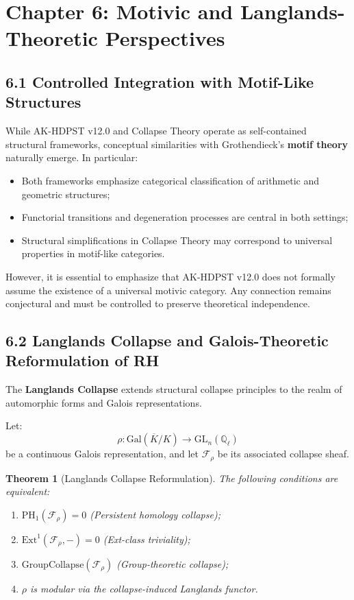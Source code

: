 \documentclass[11pt]{article}
\newtheorem{theorem}{Theorem}[section]
\begin{document}
\section{Chapter 6: Motivic and Langlands-Theoretic Perspectives}

\subsection*{6.1 Controlled Integration with Motif-Like Structures}

While AK-HDPST v12.0 and Collapse Theory operate as self-contained structural frameworks, conceptual similarities with Grothendieck's \textbf{motif theory} naturally emerge. In particular:

\begin{itemize}
    \item Both frameworks emphasize categorical classification of arithmetic and geometric structures;
    \item Functorial transitions and degeneration processes are central in both settings;
    \item Structural simplifications in Collapse Theory may correspond to universal properties in motif-like categories.
\end{itemize}

However, it is essential to emphasize that AK-HDPST v12.0 does not formally assume the existence of a universal motivic category. Any connection remains conjectural and must be controlled to preserve theoretical independence.

\subsection*{6.2 Langlands Collapse and Galois-Theoretic Reformulation of RH}

The \textbf{Langlands Collapse} extends structural collapse principles to the realm of automorphic forms and Galois representations.

Let:
\[
\rho : \mathrm{Gal}(\overline{K}/K) \longrightarrow \mathrm{GL}_n(\mathbb{Q}_\ell)
\]
be a continuous Galois representation, and let $\mathcal{F}_\rho$ be its associated collapse sheaf.

\begin{theorem}[Langlands Collapse Reformulation]
The following conditions are equivalent:
\begin{enumerate}
    \item $\mathrm{PH}_1(\mathcal{F}_\rho) = 0$ \quad (Persistent homology collapse);
    \item $\mathrm{Ext}^1(\mathcal{F}_\rho, -) = 0$ \quad (Ext-class triviality);
    \item $\mathrm{GroupCollapse}(\mathcal{F}_\rho)$ \quad (Group-theoretic collapse);
    \item $\rho$ is modular via the collapse-induced Langlands functor.
\end{enumerate}
\end{theorem}
\end{document}
